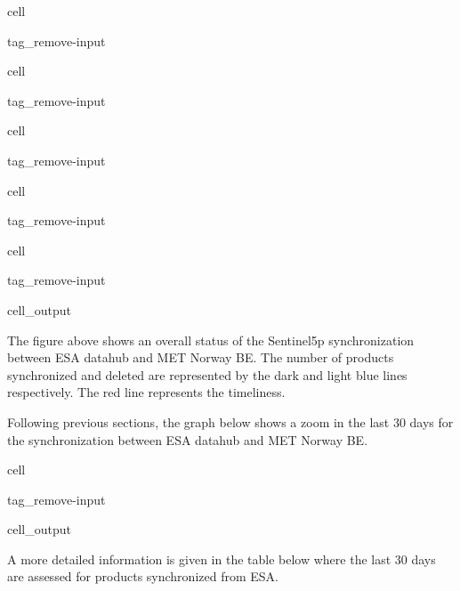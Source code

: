 \documentclass[letterpaper,10pt,english]{jupyterBook}
\begin{document}
\begin{sphinxuseclass}{cell}
\begin{sphinxuseclass}{tag_remove-input}
\end{sphinxuseclass}
\end{sphinxuseclass}
\begin{sphinxuseclass}{cell}
\begin{sphinxuseclass}{tag_remove-input}
\end{sphinxuseclass}
\end{sphinxuseclass}
\begin{sphinxuseclass}{cell}
\begin{sphinxuseclass}{tag_remove-input}
\end{sphinxuseclass}
\end{sphinxuseclass}
\begin{sphinxuseclass}{cell}
\begin{sphinxuseclass}{tag_remove-input}
\end{sphinxuseclass}
\end{sphinxuseclass}
\begin{sphinxuseclass}{cell}
\begin{sphinxuseclass}{tag_remove-input}\begin{sphinxVerbatimOutput}

\begin{sphinxuseclass}{cell_output}
\noindent{}

\end{sphinxuseclass}\end{sphinxVerbatimOutput}

\end{sphinxuseclass}
\end{sphinxuseclass}
\sphinxAtStartPar
The figure above shows an overall status of the Sentinel\sphinxhyphen{}5p synchronization between ESA datahub and MET Norway BE. The number of products synchronized and deleted are represented by the dark and light blue lines respectively. The red line represents the timeliness.

\sphinxAtStartPar
Following previous sections, the graph below shows a zoom in the last 30 days for the synchronization between ESA datahub and MET Norway BE.

\begin{sphinxuseclass}{cell}
\begin{sphinxuseclass}{tag_remove-input}\begin{sphinxVerbatimOutput}

\begin{sphinxuseclass}{cell_output}
\noindent{}

\end{sphinxuseclass}\end{sphinxVerbatimOutput}

\end{sphinxuseclass}
\end{sphinxuseclass}
\sphinxAtStartPar
A more detailed information is given in the table below where the last 30 days are assessed for products synchronized from ESA.
\end{document}
